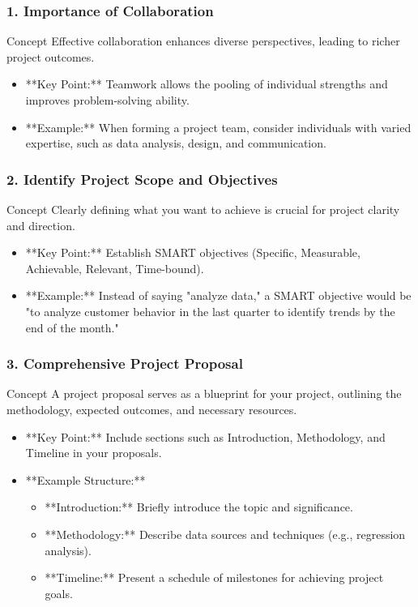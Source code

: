\documentclass[aspectratio=169]{beamer}
\begin{document}
\begin{frame}[fragile]
    \frametitle{1. Importance of Collaboration}
    \begin{block}{Concept}
        Effective collaboration enhances diverse perspectives, leading to richer project outcomes.
    \end{block}
    \begin{itemize}
        \item **Key Point:** Teamwork allows the pooling of individual strengths and improves problem-solving ability.
        \item **Example:** When forming a project team, consider individuals with varied expertise, such as data analysis, design, and communication.
    \end{itemize}
\end{frame}

\begin{frame}[fragile]
    \frametitle{2. Identify Project Scope and Objectives}
    \begin{block}{Concept}
        Clearly defining what you want to achieve is crucial for project clarity and direction.
    \end{block}
    \begin{itemize}
        \item **Key Point:** Establish SMART objectives (Specific, Measurable, Achievable, Relevant, Time-bound).
        \item **Example:** Instead of saying "analyze data," a SMART objective would be "to analyze customer behavior in the last quarter to identify trends by the end of the month."
    \end{itemize}
\end{frame}

\begin{frame}[fragile]
    \frametitle{3. Comprehensive Project Proposal}
    \begin{block}{Concept}
        A project proposal serves as a blueprint for your project, outlining the methodology, expected outcomes, and necessary resources.
    \end{block}
    \begin{itemize}
        \item **Key Point:** Include sections such as Introduction, Methodology, and Timeline in your proposals.
        \item **Example Structure:**
            \begin{itemize}
                \item **Introduction:** Briefly introduce the topic and significance.
                \item **Methodology:** Describe data sources and techniques (e.g., regression analysis).
                \item **Timeline:** Present a schedule of milestones for achieving project goals.
            \end{itemize} 
    \end{itemize}
\end{frame}
\end{document}
